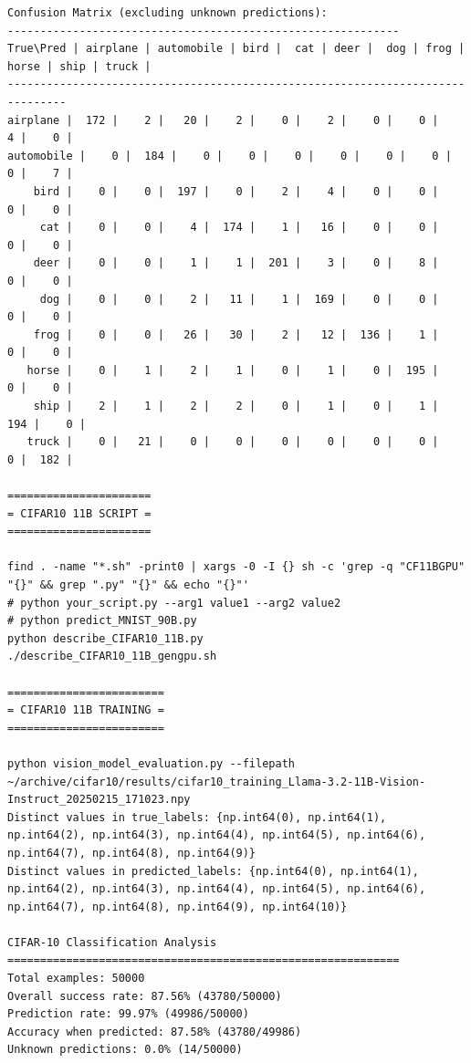 \begin{verbatim}
Confusion Matrix (excluding unknown predictions):
------------------------------------------------------------
True\Pred | airplane | automobile | bird |  cat | deer |  dog | frog | horse | ship | truck |
-------------------------------------------------------------------------------
airplane |  172 |    2 |   20 |    2 |    0 |    2 |    0 |    0 |    4 |    0 |
automobile |    0 |  184 |    0 |    0 |    0 |    0 |    0 |    0 |    0 |    7 |
    bird |    0 |    0 |  197 |    0 |    2 |    4 |    0 |    0 |    0 |    0 |
     cat |    0 |    0 |    4 |  174 |    1 |   16 |    0 |    0 |    0 |    0 |
    deer |    0 |    0 |    1 |    1 |  201 |    3 |    0 |    8 |    0 |    0 |
     dog |    0 |    0 |    2 |   11 |    1 |  169 |    0 |    0 |    0 |    0 |
    frog |    0 |    0 |   26 |   30 |    2 |   12 |  136 |    1 |    0 |    0 |
   horse |    0 |    1 |    2 |    1 |    0 |    1 |    0 |  195 |    0 |    0 |
    ship |    2 |    1 |    2 |    2 |    0 |    1 |    0 |    1 |  194 |    0 |
   truck |    0 |   21 |    0 |    0 |    0 |    0 |    0 |    0 |    0 |  182 |

======================
= CIFAR10 11B SCRIPT =
======================

find . -name "*.sh" -print0 | xargs -0 -I {} sh -c 'grep -q "CF11BGPU" "{}" && grep ".py" "{}" && echo "{}"'
# python your_script.py --arg1 value1 --arg2 value2
# python predict_MNIST_90B.py
python describe_CIFAR10_11B.py
./describe_CIFAR10_11B_gengpu.sh

========================
= CIFAR10 11B TRAINING =
========================

python vision_model_evaluation.py --filepath ~/archive/cifar10/results/cifar10_training_Llama-3.2-11B-Vision-Instruct_20250215_171023.npy
Distinct values in true_labels: {np.int64(0), np.int64(1), np.int64(2), np.int64(3), np.int64(4), np.int64(5), np.int64(6), np.int64(7), np.int64(8), np.int64(9)}
Distinct values in predicted_labels: {np.int64(0), np.int64(1), np.int64(2), np.int64(3), np.int64(4), np.int64(5), np.int64(6), np.int64(7), np.int64(8), np.int64(9), np.int64(10)}

CIFAR-10 Classification Analysis
============================================================
Total examples: 50000
Overall success rate: 87.56% (43780/50000)
Prediction rate: 99.97% (49986/50000)
Accuracy when predicted: 87.58% (43780/49986)
Unknown predictions: 0.0% (14/50000)


\end{verbatim}
